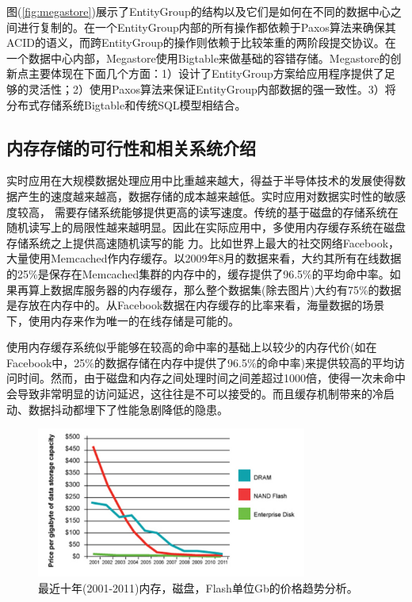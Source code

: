 图(\ref{fig:megastore})展示了EntityGroup的结构以及它们是如何在不同的数据中心之间进行复制的。在一个EntityGroup内部的所有操作都依赖于Paxos算法来确保其ACID的语义，而跨EntityGroup的操作则依赖于比较笨重的两阶段提交协议。在一个数据中心内部，Megastore使用Bigtable来做基础的容错存储。Megastore的创新点主要体现在下面几个方面：1）设计了EntityGroup方案给应用程序提供了足够的灵活性；2）使用Paxos算法来保证EntityGroup内部数据的强一致性。3）将分布式存储系统Bigtable和传统SQL模型相结合。

\subsection{内存存储的可行性和相关系统介绍}
实时应用在大规模数据处理应用中比重越来越大，得益于半导体技术的发展使得数
据产生的速度越来越高，数据存储的成本越来越低。实时应用对数据实时性的敏感度较高，
需要存储系统能够提供更高的读写速度。传统的基于磁盘的存储系统在随机读写上的局限性越来越明显。因此在实际应用中，多使用内存缓存系统在磁盘存储系统之上提供高速随机读写的能
力。比如世界上最大的社交网络Facebook，大量使用Memcached作内存缓存。以2009年8月的数据来看\cite{ousterhout2010case}，大约其所有在线数据的25\%是保存在Memcached集群的内存中的，缓存提供了96.5\%的平均命中率。如果再算上数据库服务器的内存缓存，那么整个数据集(除去图片)大约有75\%的数据是存放在内存中的。从Facebook数据在内存缓存的比率来看，海量数据的场景下，使用内存来作为唯一的在线存储是可能的。

使用内存缓存系统似乎能够在较高的命中率的基础上以较少的内存代价(如在Facebook中，25\%的数据存储在内存中提供了96.5\%的命中率)来提供较高的平均访问时间。然而，由于磁盘和内存之间处理时间之间差超过1000倍，使得一次未命中会导致非常明显的访问延迟，这往往是不可以接受的。而且缓存机制带来的冷启动、数据抖动都埋下了性能急剧降低的隐患。

\begin{figure}[h!]
  \centering
  \includegraphics[width=3.5in]{../figures/mp.pdf}
  \caption{最近十年(2001-2011)内存，磁盘，Flash单位Gb的价格趋势分析。}
  \label{fig:price}
\end{figure}

